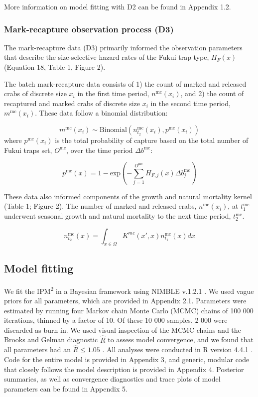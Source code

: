 \documentclass{article}
\begin{document}
More information on model fitting with D2 can be found in Appendix 1.2.

\subsubsection*{Mark-recapture observation process (D3)}

The mark-recapture data (D3) primarily informed the observation parameters that describe the size-selective hazard rates of the Fukui trap type, $H_F(x)$ (Equation 18, Table 1, Figure 2).

The batch mark-recapture data consists of 1) the count of marked and released crabs of discrete size $x_i$ in the first time period, $n^{\text{mc}}(x_i)$, and 2) the count of recaptured and marked crabs of discrete size $x_i$ in the second time period, $m^{\text{mc}}(x_i)$. These data follow a binomial distribution:

\begin{equation}
m^{\text{mc}}(x_i) \sim \text{Binomial}(n^{\text{mc}}_{t_2}(x_i), p^{\text{mc}}(x_i)) 
\end{equation}
where $p^{\text{mc}}(x_i)$ is the total probability of capture based on the total number of Fukui traps set, $O^{\text{mc}}$, over the time period $\Delta b^{\text{mc}}$:

\begin{equation}
p^{\text{mc}}(x) = 1-\text{exp}\left(-\sum_{j=1}^{O^{\text{mc}}} H_{F,j}(x)\Delta b^{\text{mc}}_j\right)
\end{equation}

These data also informed components of the growth and natural mortality kernel (Table 1; Figure 2). The number of marked and released crabs, $n^{\text{mc}}(x_i)$, at $t_1^{\text{mc}}$ underwent seasonal growth and natural mortality to the next time period, $t_2^{\text{mc}}$.

\begin{equation}
n^{\text{mc}}_{t_2}(x) = \int_{x \in \Omega} K^{mc}(x',x) n^{\text{mc}}_{t_1}(x)dx
\end{equation}

\subsection{Model fitting}
We fit the IPM\textsuperscript{2} in a Bayesian framework using NIMBLE v.1.2.1 \parencite{de2017programming}. We used vague priors for all parameters, which are provided in Appendix 2.1. Parameters were estimated by running four Markov chain Monte Carlo (MCMC) chains of 100 000 iterations, thinned by a factor of 10. Of these 10 000 samples, 2 000 were discarded as burn-in. We used visual inspection of the MCMC chains and the Brooks and Gelman diagnostic $\hat{R}$ to assess model convergence, and we found that all parameters had an $\hat{R} \leq 1.05$ \parencite{brooks1998general}. All analyses were conducted in R version 4.4.1 \parencite{Rcore}. Code for the entire model is provided in Appendix 3, and generic, modular code that closely follows the model description is provided in Appendix 4. Posterior summaries, as well as convergence diagnostics and trace plots of model parameters can be found in Appendix 5.
\end{document}
